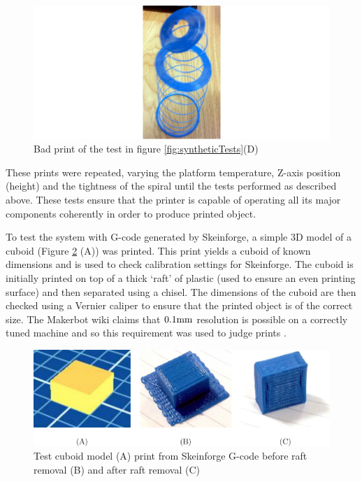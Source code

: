 			\begin{figure}
				\includegraphics[width=1\textwidth]{diagrams/looseSpiral.pdf}
				\caption{Bad print of the test in figure \ref{fig:syntheticTests}(D)}
				\label{fig:looseSpiral}
			\end{figure}
			
			These prints were repeated, varying the platform temperature, Z-axis
			position (height) and the tightness of the spiral until the tests
			performed as described above. These tests ensure that the printer is
			capable of operating all its major components coherently in order to
			produce printed object.
			
			
			
			To test the system with G-code generated by Skeinforge, a simple 3D model
			of a cuboid (Figure \ref{fig:testCubes} (A)) was printed. This print
			yields a cuboid of known dimensions and is used to check calibration
			settings for Skeinforge. The cuboid is initially printed on top of a thick
			`raft' of plastic (used to ensure an even printing surface) and then
			separated using a chisel. The dimensions of the cuboid are then checked
			using a Vernier caliper to ensure that the printed object is of the
			correct size. The Makerbot wiki claims that $0.1\textrm{mm}$ resolution is
			possible on a correctly tuned machine and so this requirement was used to
			judge prints \cite{makerbotfaq}.
			
			\begin{figure}
				\includegraphics[width=1\textwidth]{diagrams/testCubes.pdf}
				\caption{Test cuboid model (A) print from Skeinforge G-code before raft
				         removal (B) and after raft removal (C)}
				\label{fig:testCubes}
			\end{figure}
			
